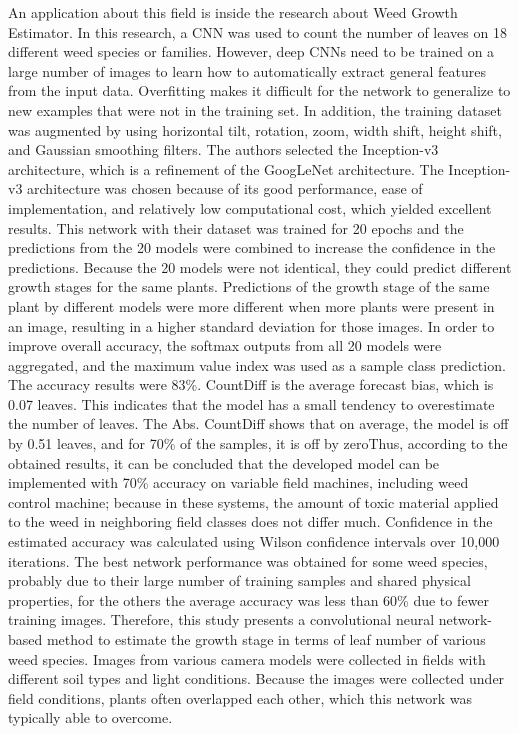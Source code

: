 An application about this field is inside the research about Weed Growth Estimator\cite{s18051580}. In this research, a CNN was used to count the number of leaves on 18 different weed species or families. However, deep CNNs need to be trained on a large number of images
to learn how to automatically extract general features from the input data. Overfitting makes it difficult for the network to generalize to new examples that were not in
the training set. In addition, the training dataset was augmented by using horizontal tilt, rotation, zoom, width shift, height shift, and Gaussian smoothing filters. The
authors selected the Inception-v3 architecture, which is a refinement of the GoogLeNet architecture. The Inception-v3 architecture was chosen because of its good
performance, ease of implementation, and relatively low computational cost, which yielded excellent results. This network with their dataset was trained for 20 epochs
and the predictions from the 20 models were combined to increase the confidence in the predictions. Because the 20 models were not identical, they could predict different
growth stages for the same plants. Predictions of the growth stage of the same plant by different models were more different when more plants were present in an image,
resulting in a higher standard deviation for those images. In order to improve overall accuracy, the softmax outputs from all 20 models were aggregated, and the maximum
value index was used as a sample class prediction. The accuracy results were 83\%. CountDiff is the average forecast bias, which is 0.07 leaves. This indicates that the
model has a small tendency to overestimate the number of leaves. The Abs. CountDiff shows that on average, the model is off by 0.51 leaves, and for 70\% of the samples,
it is off by zeroThus, according to the obtained results, it can be concluded that the developed model can be implemented with 70\% accuracy on variable field machines,
including weed control machine; because in these systems, the amount of toxic material applied to the weed in neighboring field classes does not differ much. Confidence
in the estimated accuracy was calculated using Wilson confidence intervals over 10,000 iterations. The best network performance was obtained for some weed species, probably
due to their large number of training samples and shared physical properties, for the others the average accuracy was less than 60\% due to fewer training images. Therefore,
this study presents a convolutional neural network-based method to estimate the growth stage in terms of leaf number of various weed species. Images from various camera
models were collected in fields with different soil types and light conditions. Because the images were collected under field conditions, plants often overlapped each
other, which this network was typically able to overcome.

